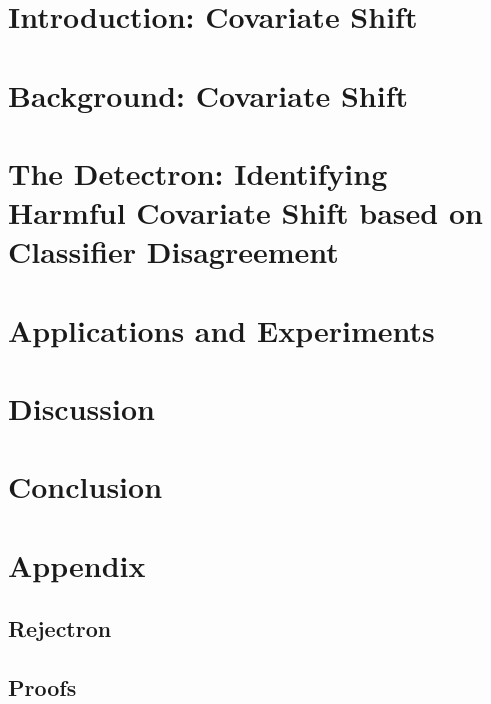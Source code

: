 \documentclass{ut-thesis}
\begin{document}
    \chapter[Introduction]{Introduction: Covariate Shift}
    \label{ch:intro}

    


    \chapter[Background: Covariate Shift]{Background: Covariate Shift}\label{ch:related}

    

    \chapter[Detectron: Methodlogy]{The Detectron: Identifying Harmful Covariate Shift based on Classifier Disagreement}\label{ch:detectron}

    


    \chapter{Applications and Experiments}\label{ch:experiments}
    \lipsum[11-12]


    \chapter{Discussion}\label{ch:discussion}
    \lipsum[13-14]


    \chapter{Conclusion}\label{ch:conclusion}
    \lipsum[15-16]

    

    \appendix


    \chapter{Appendix}\label{ch:appendix}


    \section{Rejectron}\label{sec:rejectron}
    


    \section{Proofs}\label{sec:proofs}
    
\end{document}
